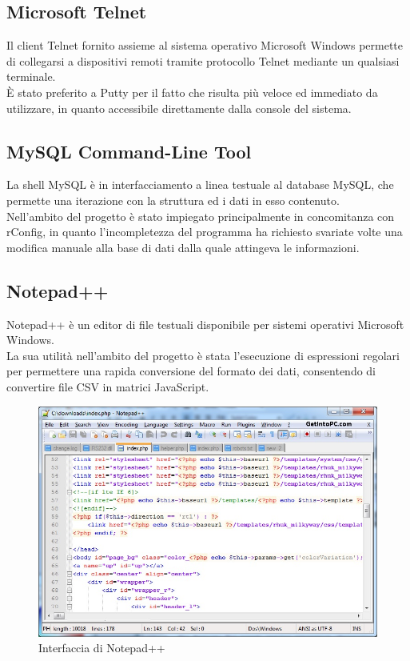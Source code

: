 \documentclass[Tesi.tex]{subfiles}
\begin{document}
\subsection{Microsoft Telnet}
Il client Telnet fornito assieme al sistema operativo Microsoft Windows permette di collegarsi a dispositivi remoti tramite protocollo Telnet mediante un qualsiasi terminale. \\
\`{E} stato preferito a Putty per il fatto che risulta più veloce ed immediato da utilizzare, in quanto accessibile direttamente dalla console del sistema.

\subsection{MySQL Command-Line Tool}
La shell MySQL è in interfacciamento a linea testuale al database MySQL, che permette una iterazione con la struttura ed i dati in esso contenuto. \\
Nell'ambito del progetto è stato impiegato principalmente in concomitanza con rConfig, in quanto l'incompletezza del programma ha richiesto svariate volte una modifica manuale alla base di dati dalla quale attingeva le informazioni.

\subsection{Notepad++}
Notepad++ è un editor di file testuali disponibile per sistemi operativi Microsoft Windows.\\
La sua utilità nell'ambito del progetto è stata l'esecuzione di espressioni regolari per permettere una rapida conversione del formato dei dati, consentendo di convertire file CSV in matrici JavaScript.
\begin{figure}[H]
	\centering
	\includegraphics[width=0.75\linewidth]{"images/notepad++"}
	\caption{Interfaccia di Notepad++}
	\label{fig:Interfaccia di Notepad++}
\end{figure}
\end{document}
